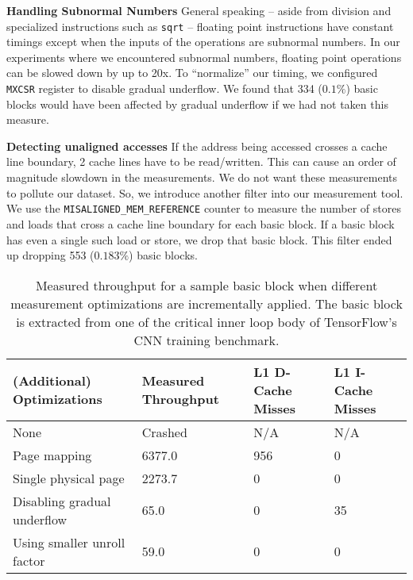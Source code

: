\textbf{Handling Subnormal Numbers}
General speaking -- aside from division
and specialized instructions such as \verb|sqrt|
-- floating point instructions have constant timings
except when the inputs of the operations are subnormal numbers.
In our experiments where we encountered subnormal numbers,
floating point operations can be slowed down by up to 20x.
To ``normalize'' our timing, we configured \verb|MXCSR| register
to disable gradual underflow.
We found that 334 ($0.1\%$) basic blocks would have been affected by 
gradual underflow if we had not taken this measure.


\textbf{Detecting unaligned accesses}
If the address being 
accessed crosses a cache line boundary, 2 cache lines have to be read/written. This can cause
an order of magnitude slowdown in the measurements. We do not want these measurements to 
pollute our dataset. So, we introduce another filter into our measurement tool. We use the 
\verb|MISALIGNED_MEM_REFERENCE| counter to measure the number of stores and loads that cross a cache line boundary for 
each basic block. If a basic block has even a single such load or store, we drop that basic block. 
This filter ended up dropping 553 ($0.183\%$) basic blocks. 

\begin{table}
\begin{tabular}{
|p{}|p{}|p{}|p{}|}
\hline \textbf{(Additional) Optimizations} &
\textbf{Measured Throughput} &
\textbf{L1 D-Cache Misses} &
\textbf{L1 I-Cache Misses} \\

\hline
None & Crashed & N/A & N/A \\

\hline
Page mapping & 6377.0 & 956 & 0 \\

\hline
Single physical page & 2273.7 & 0 & 0 \\

\hline
Disabling gradual underflow & 65.0 & 0 & 35 \\

\hline
Using smaller unroll factor & 59.0 & 0 & 0\\

\hline
\end{tabular}
\\
\caption{Measured throughput for a sample basic block when
different measurement optimizations are incrementally applied.
The basic block is extracted from one of the critical 
inner loop body of TensorFlow\cite{tensorflow}'s CNN training benchmark.}
\label{tab:ablation}
\end{table}